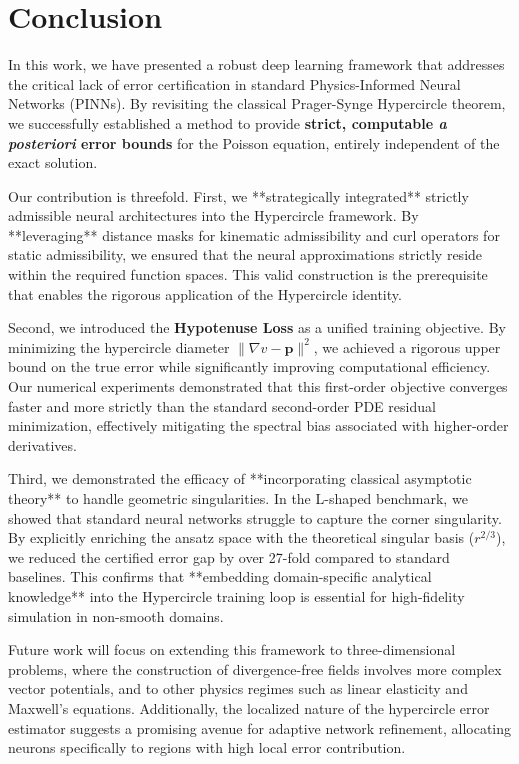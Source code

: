 \documentclass[12pt, a4paper]{article}
\begin{document}
\section{Conclusion}

In this work, we have presented a robust deep learning framework that addresses the critical lack of error certification in standard Physics-Informed Neural Networks (PINNs). By revisiting the classical Prager-Synge Hypercircle theorem, we successfully established a method to provide \textbf{strict, computable \textit{a posteriori} error bounds} for the Poisson equation, entirely independent of the exact solution.

Our contribution is threefold. First, we **strategically integrated** strictly admissible neural architectures into the Hypercircle framework. By **leveraging** distance masks for kinematic admissibility and curl operators for static admissibility, we ensured that the neural approximations strictly reside within the required function spaces. This valid construction is the prerequisite that enables the rigorous application of the Hypercircle identity.

Second, we introduced the \textbf{Hypotenuse Loss} as a unified training objective. By minimizing the hypercircle diameter $\|\nabla v - \mathbf{p}\|^2$, we achieved a rigorous upper bound on the true error while significantly improving computational efficiency. Our numerical experiments demonstrated that this first-order objective converges faster and more strictly than the standard second-order PDE residual minimization, effectively mitigating the spectral bias associated with higher-order derivatives.

Third, we demonstrated the efficacy of **incorporating classical asymptotic theory** to handle geometric singularities. In the L-shaped benchmark, we showed that standard neural networks struggle to capture the corner singularity. By explicitly enriching the ansatz space with the theoretical singular basis ($r^{2/3}$), we reduced the certified error gap by over 27-fold compared to standard baselines. This confirms that **embedding domain-specific analytical knowledge** into the Hypercircle training loop is essential for high-fidelity simulation in non-smooth domains.

Future work will focus on extending this framework to three-dimensional problems, where the construction of divergence-free fields involves more complex vector potentials, and to other physics regimes such as linear elasticity and Maxwell's equations. Additionally, the localized nature of the hypercircle error estimator suggests a promising avenue for adaptive network refinement, allocating neurons specifically to regions with high local error contribution.
\end{document}
